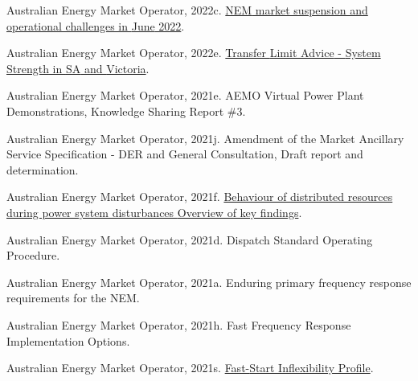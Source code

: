 \documentclass[12pt,a4paper,]{report}
\newlength{\cslhangindent}
\newenvironment{CSLReferences}[2] %
 {%
  \setlength{\parindent}{0pt}
  \ifodd #1 \everypar{\setlength{\hangindent}{\cslhangindent}}\ignorespaces\fi
  \ifnum #2 > 0
  \setlength{\parskip}{#2\baselineskip}
  \fi
 }%
 {}
\begin{document}
\begin{CSLReferences}{1}{0}
\leavevmode{}%
Australian Energy Market Operator, 2022c.
\href{https://aemo.com.au/-/media/files/electricity/nem/market_notices_and_events/market_event_reports/2022/nem-market-suspension-and-operational-challenges-in-june-2022.pdf?la=en}{{NEM}
market suspension and operational challenges in {June} 2022}.

\leavevmode{}%
Australian Energy Market Operator, 2022e.
\href{https://www.aemo.com.au/-/media/files/electricity/nem/security_and_reliability/congestion-information/transfer-limit-advice-system-strength.pdf?la=en}{Transfer
{Limit Advice} - {System Strength} in {SA} and {Victoria}}.

\leavevmode{}%
Australian Energy Market Operator, 2021e. {AEMO Virtual Power Plant
Demonstrations}, {Knowledge Sharing Report} \#3.

\leavevmode{}%
Australian Energy Market Operator, 2021j. Amendment of the {Market
Ancillary Service Specification} - {DER} and {General Consultation},
{Draft} report and determination.

\leavevmode{}%
Australian Energy Market Operator, 2021f.
\href{https://aemo.com.au/en/initiatives/major-programs/nem-distributed-energy-resources-der-program/operations/der-behaviour-during-disturbances}{Behaviour
of distributed resources during power system disturbances {Overview} of
key findings}.

\leavevmode{}%
Australian Energy Market Operator, 2021d. Dispatch {Standard Operating
Procedure}.

\leavevmode{}%
Australian Energy Market Operator, 2021a. Enduring primary frequency
response requirements for the {NEM}.

\leavevmode{}%
Australian Energy Market Operator, 2021h. Fast {Frequency Response
Implementation Options}.

\leavevmode{}%
Australian Energy Market Operator, 2021s.
\href{https://aemo.com.au/-/media/files/electricity/nem/security_and_reliability/dispatch/policy_and_process/fast-start-unit-inflexibility-profile.pdf}{Fast-{Start
Inflexibility Profile}}.


\end{CSLReferences}
\end{document}
